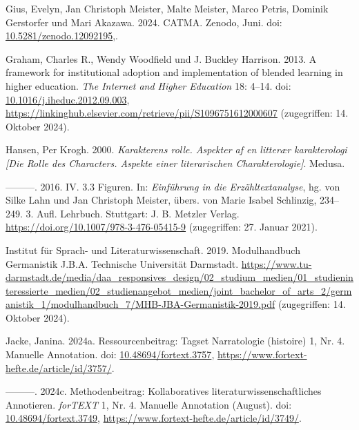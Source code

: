 \documentclass[
          a4paper,
        ]{article}
\newlength{\cslhangindent}
\newenvironment{CSLReferences}[2] %
 {\begin{list}{}{%
  \setlength{\itemindent}{0pt}
  \setlength{\leftmargin}{0pt}
  \setlength{\parsep}{0pt}
  \ifodd #1
   \setlength{\leftmargin}{\cslhangindent}
   \setlength{\itemindent}{-1\cslhangindent}
  \fi
  \setlength{\itemsep}{#2\baselineskip}}}
 {\end{list}}
\begin{document}
\begin{CSLReferences}{1}{0}
Gius, Evelyn, Jan Christoph Meister, Malte Meister, Marco Petris,
Dominik Gerstorfer und Mari Akazawa. 2024. {CATMA}. Zenodo, Juni. doi:
\href{https://doi.org/10.5281/zenodo.12092195}{10.5281/zenodo.12092195},.

Graham, Charles R., Wendy Woodfield und J. Buckley Harrison. 2013. A
framework for institutional adoption and implementation of blended
learning in higher education. \emph{The Internet and Higher Education}
18: 4--14. doi:
\href{https://doi.org/10.1016/j.iheduc.2012.09.003}{10.1016/j.iheduc.2012.09.003},
\url{https://linkinghub.elsevier.com/retrieve/pii/S1096751612000607}
(zugegriffen: 14. Oktober 2024).

Hansen, Per Krogh. 2000. \emph{Karakterens rolle. Aspekter af en
litterær karakterologi {[}Die Rolle des Characters. Aspekte einer
literarischen Charakterologie{]}}. Medusa.

---------. 2016. {IV}. 3.3 {Figuren}. In: \emph{Einführung in die
{Erzähltextanalyse}}, hg. von Silke Lahn und Jan Christoph Meister,
übers. von Marie Isabel Schlinzig, 234--249. 3. Aufl. Lehrbuch.
Stuttgart: J. B. Metzler Verlag.
\url{https://doi.org/10.1007/978-3-476-05415-9} (zugegriffen: 27. Januar
2021).

Institut für Sprach- und Literaturwissenschaft. 2019. Modulhandbuch
{Germanistik} {J}.{B}.{A}. Technische Universität Darmstadt.
\url{https://www.tu-darmstadt.de/media/daa_responsives_design/02_studium_medien/01_studieninteressierte_medien/02_studienangebot_medien/joint_bachelor_of_arts_2/germanistik_1/modulhandbuch_7/MHB-JBA-Germanistik-2019.pdf}
(zugegriffen: 14. Oktober 2024).

Jacke, Janina. 2024a. Ressourcenbeitrag: {Tagset} {Narratologie}
(histoire) 1, Nr. 4. Manuelle Annotation. doi:
\href{https://doi.org/10.48694/fortext.3757}{10.48694/fortext.3757},
\url{https://www.fortext-hefte.de/article/id/3757/}.

---------. 2024c. Methodenbeitrag: {Kollaboratives}
literaturwissenschaftliches {Annotieren}. \emph{forTEXT} 1, Nr. 4.
Manuelle Annotation (August). doi:
\href{https://doi.org/10.48694/fortext.3749}{10.48694/fortext.3749},
\url{https://www.fortext-hefte.de/article/id/3749/}.


\end{CSLReferences}
\end{document}
